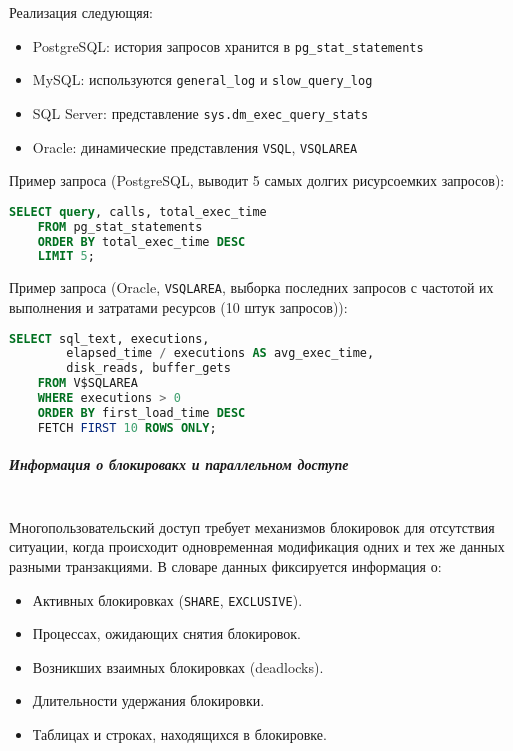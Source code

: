 Реализация следующяя:
\begin{itemize}
    \item PostgreSQL: история запросов хранится в \texttt{pg\_stat\_statements} \autocite{PgStatStatements1}
    \item MySQL: используются \texttt{general\_log} и \texttt{slow\_query\_log} \autocite{Mysqldoc3}
    \item SQL Server: представление \texttt{sys.dm\_exec\_query\_stats} \autocite{MicrosoftLearnSQLserverQueryStat}
    \item Oracle: динамические представления \texttt{V\textdollar SQL}, \texttt{V\textdollar SQLAREA} \autocite[c.9 §46-49, c.9 §71]{oracledbdoc2}
\end{itemize}

Пример запроса (PostgreSQL, выводит 5 самых долгих рисурсоемких запросов):
\begin{lstlisting}[language=SQL]
    SELECT query, calls, total_exec_time 
    FROM pg_stat_statements 
    ORDER BY total_exec_time DESC 
    LIMIT 5;                 
\end{lstlisting}

Пример запроса (Oracle, \texttt{V\textdollar SQLAREA}, выборка последних запросов с частотой их выполнения и затратами ресурсов (10 штук запросов)):
\begin{lstlisting}[language=SQL]
    SELECT sql_text, executions, 
        elapsed_time / executions AS avg_exec_time, 
        disk_reads, buffer_gets 
    FROM V$SQLAREA 
    WHERE executions > 0 
    ORDER BY first_load_time DESC 
    FETCH FIRST 10 ROWS ONLY;
\end{lstlisting}

\subparagraph{Информация о блокировакх и параллельном доступе} ~\\

Многопользовательский доступ требует механизмов блокировок для отсутствия ситуации, когда происходит одновременная модификация одних и тех же данных разными транзакциями. В словаре данных фиксируется информация о:
\begin{itemize}
    \item Активных блокировках (\texttt{SHARE}, \texttt{EXCLUSIVE}).
    \item Процессах, ожидающих снятия блокировок.
    \item Возникших взаимных блокировках (deadlocks).
    \item Длительности удержания блокировки.
    \item Таблицах и строках, находящихся в блокировке.
\end{itemize}

